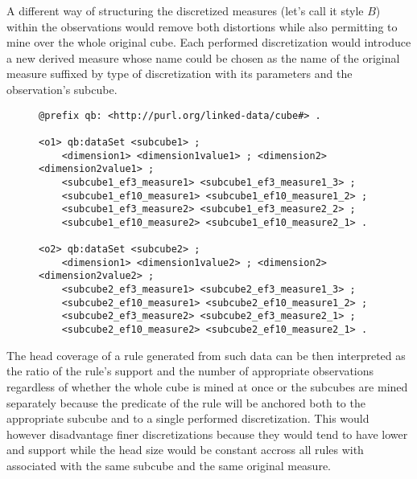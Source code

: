 A different way of structuring the discretized measures (let's call it style $B$) within the observations would remove both distortions while also permitting to mine over the whole original cube. Each performed discretization would introduce a new derived measure whose name could be chosen as the name of the original measure suffixed by type of discretization with its parameters and the observation's subcube.

\begin{figure}[h]
\begin{lstlisting}[language = turtle, caption={Discretization style B}, label={discsample},captionpos=b escapeinside={(*@}{@*)}]
@prefix qb: <http://purl.org/linked-data/cube#> .
                
<o1> qb:dataSet <subcube1> ;
    <dimension1> <dimension1value1> ; <dimension2> <dimension2value1> ;
    <subcube1_ef3_measure1> <subcube1_ef3_measure1_3> ;
    <subcube1_ef10_measure1> <subcube1_ef10_measure1_2> ;
    <subcube1_ef3_measure2> <subcube1_ef3_measure2_2> ; 
    <subcube1_ef10_measure2> <subcube1_ef10_measure2_1> .
       
<o2> qb:dataSet <subcube2> ;
    <dimension1> <dimension1value2> ; <dimension2> <dimension2value2> ;
    <subcube2_ef3_measure1> <subcube2_ef3_measure1_3> ;
    <subcube2_ef10_measure1> <subcube2_ef10_measure1_2> ;
    <subcube2_ef3_measure2> <subcube2_ef3_measure2_1> ;
    <subcube2_ef10_measure2> <subcube2_ef10_measure2_1> .
\end{lstlisting}
\end{figure}

The head coverage of a rule generated from such data can be then interpreted as the ratio of the rule's support and the number of appropriate observations regardless of whether the whole cube is mined at once or the subcubes are mined separately because the predicate of the rule will be anchored both to the appropriate subcube and to a single performed discretization. This would however disadvantage finer discretizations because they would tend to have lower and support while the head size would be constant accross all rules with associated with the same subcube and the same original measure.

